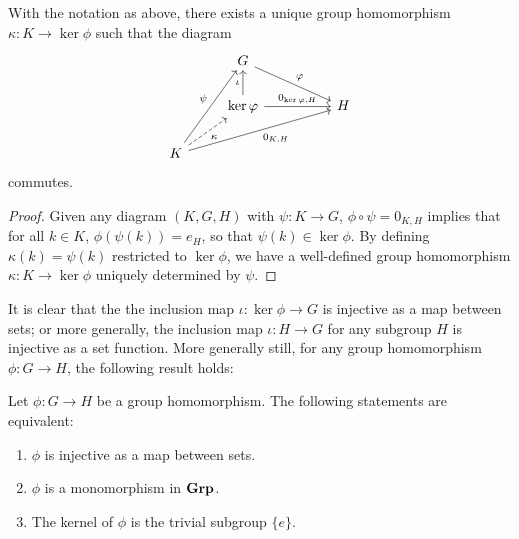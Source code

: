 \begin{theorem}
    With the notation as above, there exists a unique group homomorphism
    \(\kappa : K \to \ker \phi\) such that the diagram
    \[
        \begin{tikzcd}
            & G \arrow[rrd, "\phi"]                               &  &   \\
            & \ker\phi \arrow[u, "\iota"] \arrow[rr, "{0_{\ker\phi, H}}"] &  & H \\
        K \arrow[ruu, "\psi"] \arrow[rrru, "{0_{K,H}}"'] \arrow[ru, "\kappa"', dashed] &                                                     &  &  
        \end{tikzcd}
    \]
    commutes.
\end{theorem}

\begin{proof}
    Given any diagram \((K, G, H)\) with \(\psi: K \to G\), \(\phi \circ \psi =
    0_{K,H}\) implies that for all \(k \in K\), \(\phi(\psi(k)) = e_H\), so that
    \(\psi(k) \in \ker \phi\). By defining \(\kappa(k) = \psi(k)\) restricted to
    \(\ker \phi\), we have a well-defined group homomorphism \(\kappa: K \to
    \ker \phi\) uniquely determined by \(\psi\).
\end{proof}


It is clear that the the inclusion map \(\iota: \ker \phi \to G\) is injective
as a map between sets; or more generally, the inclusion map \(\iota: H \to G\)
for any subgroup \(H\) is injective as a set function. More generally still, for
any group homomorphism \(\phi: G \to H\), the following result holds:

\begin{theorem}
    Let \(\phi: G \to H\) be a group homomorphism. The following statements are
    equivalent:
    \begin{enumerate}[label=(\alph*)]
        \item \(\phi\) is injective as a map between sets.
        \item \(\phi\) is a monomorphism in \(\mathbf{Grp}\).
        \item The kernel of \(\phi\) is the trivial subgroup \(\{e\}\).
    \end{enumerate}
\end{theorem}

